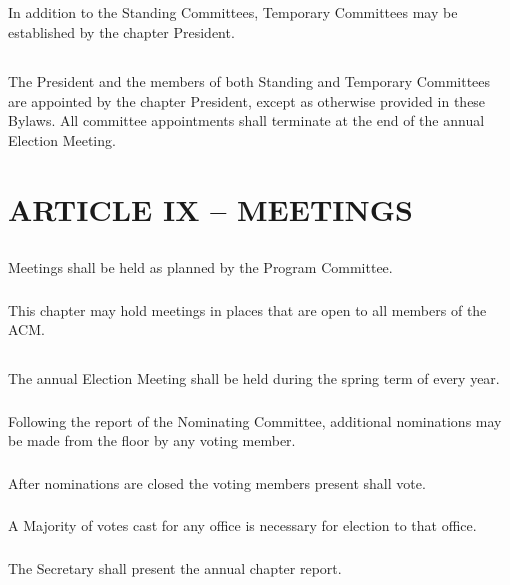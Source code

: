 \documentclass[12pt]{article}
\begin{document}
\subsection{}	In addition to the Standing Committees, Temporary Committees may be established by the chapter President.
\subsection{}	The President and the members of both Standing and Temporary Committees are appointed by the chapter President, except as otherwise provided in these Bylaws. All committee appointments shall terminate at the end of the annual Election Meeting.

\section{ARTICLE IX – MEETINGS}
\subsection{}	Meetings shall be held as planned by the Program Committee.
\subsubsection{}	This chapter may hold meetings in places that are open to all members of the ACM.
\subsection{}	The annual Election Meeting shall be held during the spring term of every year.
\subsubsection{}	Following the report of the Nominating Committee, additional nominations may be made from the floor by any voting member.
\subsubsection{}	After nominations are closed the voting members present shall vote.
\subsubsection{}	A Majority of votes cast for any office is necessary for election to that office.
\subsubsection{}	The Secretary shall present the annual chapter report.
\end{document}
